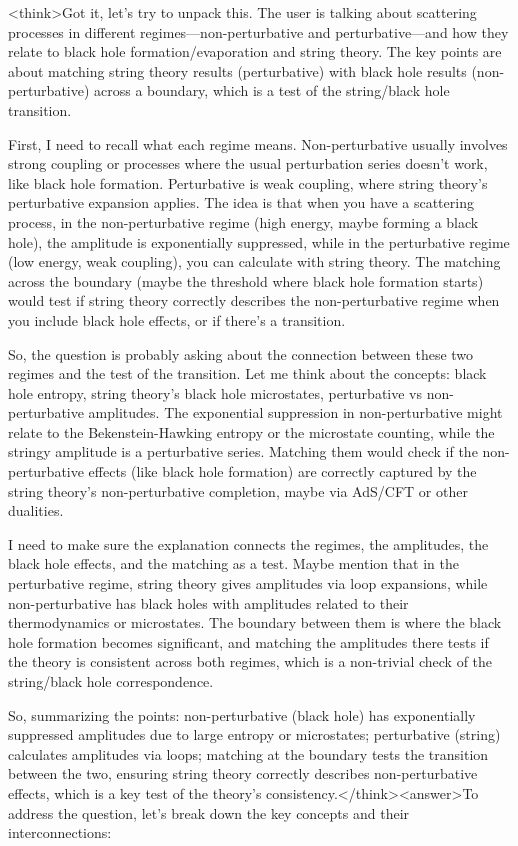 <think>Got it, let's try to unpack this. The user is talking about scattering processes in different regimes—non-perturbative and perturbative—and how they relate to black hole formation/evaporation and string theory. The key points are about matching string theory results (perturbative) with black hole results (non-perturbative) across a boundary, which is a test of the string/black hole transition.

First, I need to recall what each regime means. Non-perturbative usually involves strong coupling or processes where the usual perturbation series doesn't work, like black hole formation. Perturbative is weak coupling, where string theory's perturbative expansion applies. The idea is that when you have a scattering process, in the non-perturbative regime (high energy, maybe forming a black hole), the amplitude is exponentially suppressed, while in the perturbative regime (low energy, weak coupling), you can calculate with string theory. The matching across the boundary (maybe the threshold where black hole formation starts) would test if string theory correctly describes the non-perturbative regime when you include black hole effects, or if there's a transition.

So, the question is probably asking about the connection between these two regimes and the test of the transition. Let me think about the concepts: black hole entropy, string theory's black hole microstates, perturbative vs non-perturbative amplitudes. The exponential suppression in non-perturbative might relate to the Bekenstein-Hawking entropy or the microstate counting, while the stringy amplitude is a perturbative series. Matching them would check if the non-perturbative effects (like black hole formation) are correctly captured by the string theory's non-perturbative completion, maybe via AdS/CFT or other dualities.

I need to make sure the explanation connects the regimes, the amplitudes, the black hole effects, and the matching as a test. Maybe mention that in the perturbative regime, string theory gives amplitudes via loop expansions, while non-perturbative has black holes with amplitudes related to their thermodynamics or microstates. The boundary between them is where the black hole formation becomes significant, and matching the amplitudes there tests if the theory is consistent across both regimes, which is a non-trivial check of the string/black hole correspondence.

So, summarizing the points: non-perturbative (black hole) has exponentially suppressed amplitudes due to large entropy or microstates; perturbative (string) calculates amplitudes via loops; matching at the boundary tests the transition between the two, ensuring string theory correctly describes non-perturbative effects, which is a key test of the theory's consistency.</think><answer>To address the question, let’s break down the key concepts and their interconnections:  


